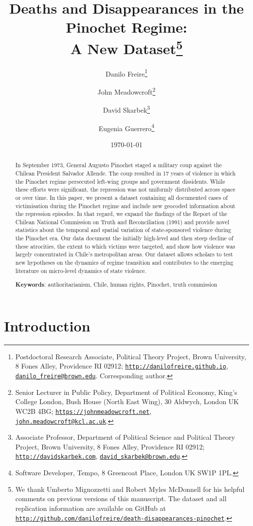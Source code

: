 \documentclass[a4paper,12pt]{article}
\title{Deaths and Disappearances in the Pinochet Regime:\\ A New Dataset\thanks{We thank Umberto Mignozzetti and Robert Myles McDonnell for his helpful comments on previous versions of this manuscript. The dataset and all replication information are available on GitHub at \href{http://github.com/danilofreire/death-disappearances-pinochet}{\texttt{http://github.com/danilofreire/death-disappearances-pinochet}}.}}
\author{Danilo Freire\thanks{Postdoctoral Research Associate, Political Theory Project, Brown University, 8 Fones Alley, Providence RI 02912; \href{http://danilofreire.github.io}{\texttt{http://danilofreire.github.io}},  \href{mailto:danilo\_freire@brown.edu}{\texttt{danilo\_freire@brown.edu}}. Corresponding author.} 
\and John Meadowcroft\thanks{Senior Lecturer in Public Policy, Department of Political Economy, King's College London, Bush House (North East Wing), 30 Aldwych, London UK WC2B 4BG; \href{https://johnmeadowcroft.net}{\texttt{https://johnmeadowcroft.net}},  \href{mailto:john.meadowcroft@kcl.ac.uk}{\texttt{john.meadowcroft@kcl.ac.uk}}.} 
\and David Skarbek\thanks{Associate Professor, Department of Political Science and Political Theory Project, Brown University, 8 Fones Alley, Providence RI 02912; \href{http://davidskarbek.com}{\texttt{http://davidskarbek.com}},  \href{mailto:david_skarbek@brown.edu}{\texttt{david\_skarbek@brown.edu}}.} 
\and Eugenia Guerrero\thanks{Software Developer, Tempo, 8 Greencoat Place, London UK SW1P 1PL.}
}
\date{\today}
\begin{document}
\maketitle
	
\begin{abstract}
\noindent In September 1973, General Augusto Pinochet staged a military coup against the Chilean President Salvador Allende. The coup resulted in 17 years of violence in which the Pinochet regime persecuted left-wing groups and government dissidents. While these efforts were significant, the repression was not uniformly distributed across space or over time. In this paper, we present a dataset containing all documented cases of victimisation during the Pinochet regime and include new geocoded information about the repression episodes. In that regard, we expand the findings of the Report of the Chilean National Commission on Truth and Reconciliation (1991) and provide novel statistics about the temporal and spatial variation of state-sponsored violence during the Pinochet era. Our data document the initially high-level and then steep decline of these atrocities, the extent to which victims were targeted, and show how violence was largely concentrated in Chile's metropolitan areas. Our dataset allows scholars to test new hypotheses on the dynamics of regime transition and contributes to the emerging literature on micro-level dynamics of state violence.
	
 \vspace{.75cm}
 \noindent
 \textbf{Keywords}: authoritarianism, Chile, human rights, Pinochet, truth commission
\end{abstract}
	
\newpage
	
\section{Introduction}
\label{sec:intro}

\doublespacing
	
\end{document}
